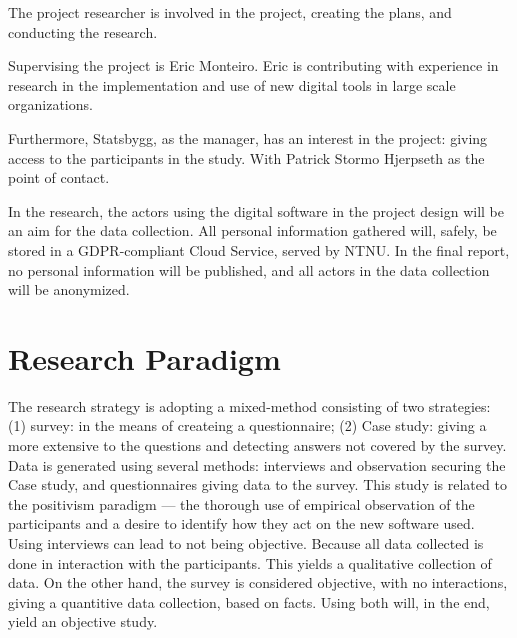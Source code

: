 The project researcher is involved in the project, creating the plans, and conducting the research.
	 
Supervising the project is Eric Monteiro. Eric is contributing with experience in research in the implementation and use of new digital tools in large scale organizations. 

Furthermore, Statsbygg, as the manager, has an interest in the project: giving access to the participants in the study. With Patrick Stormo Hjerpseth as the point of contact.
	 
In the research, the actors using the digital software in the project design will be an aim for the data collection. All personal information gathered will, safely, be stored in a GDPR-compliant Cloud Service, served by NTNU. In the final report, no personal information will be published, and all actors in the data collection will be anonymized.

\section*{Research Paradigm}

The research strategy is adopting a mixed-method consisting of two strategies: (1) survey: in the means of createing a questionnaire; (2) Case study: giving a more extensive to the questions and detecting answers not covered by the survey. Data is generated using several methods: interviews and observation securing the Case study, and questionnaires giving data to the survey. This study is related to the positivism paradigm — the thorough use of empirical observation of the participants and a desire to identify how they act on the new software used. Using interviews can lead to not being objective. Because all data collected is done in interaction with the participants. This yields a qualitative collection of data. On the other hand, the survey is considered objective, with no interactions, giving a quantitive data collection, based on facts. Using both will, in the end, yield an objective study.

